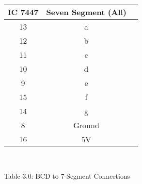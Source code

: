 \centering
\begin{tabular}{|c|c|c|}
\hline
IC 7447 & Seven Segment (All)\\
\hline
13 & a\\
\hline
12 & b\\
\hline
11 & c\\
\hline
10 & d\\
\hline
9 & e\\
\hline
15 & f\\
\hline
14 & g\\
\hline
8 & Ground\\
\hline
16 & 5V \\
\hline
\end{tabular}\\
\centerline{Table 3.0: BCD to 7-Segment Connections}
